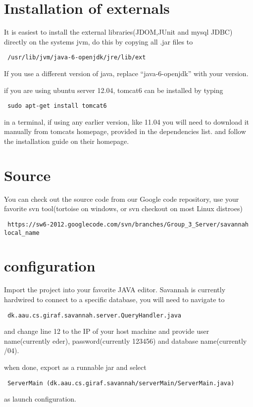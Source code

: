 \part*{Installation of externals}
It is easiest to install the external libraries(JDOM,JUnit and mysql JDBC) directly on the systems jvm, do this by copying all .jar files to 
\begin{verbatim}
 /usr/lib/jvm/java-6-openjdk/jre/lib/ext
\end{verbatim}
If you use a different version of java, replace ``java-6-openjdk'' with your version.\newline\newline

if you are using ubuntu server 12.04, tomcat6 can be installed by typing 
\begin{verbatim}
 sudo apt-get install tomcat6
\end{verbatim}
in a terminal, if using any earlier version, like 11.04 you will need to download it manually from tomcats homepage, provided in the dependencies list.
and follow the installation guide on their homepage.


\part*{Source}
You can check out the source code from our Google code repository, use your favorite svn tool(tortoise on windows, or svn checkout on most Linux distroes)
\begin{verbatim}
 https://sw6-2012.googlecode.com/svn/branches/Group_3_Server/savannah local_name
\end{verbatim}

\part*{configuration}
Import the project into your favorite JAVA editor.
Savannah is currently hardwired to connect to a specific database, you will need to navigate to 
\begin{verbatim}
 dk.aau.cs.giraf.savannah.server.QueryHandler.java
\end{verbatim}
and change line 12 to the IP of your host machine and provide user name(currently eder), password(currently 123456) and database name(currently /04).

when done, export as a runnable jar and select
\begin{verbatim}
 ServerMain (dk.aau.cs.giraf.savannah/serverMain/ServerMain.java)
\end{verbatim}
as launch configuration.

